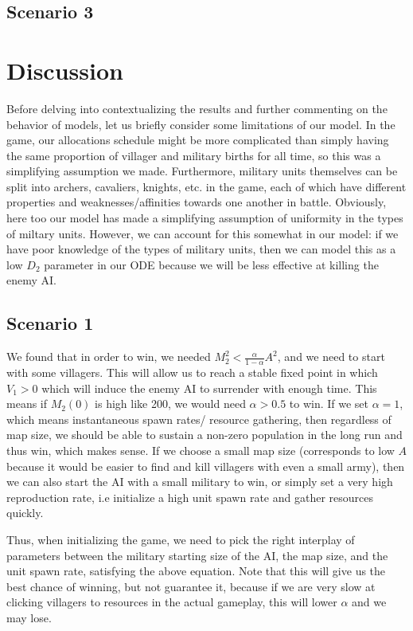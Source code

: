 \documentclass[12pt]{article}
\begin{document}
\subsection{Scenario 3}


\section{Discussion}
Before delving into contextualizing the results and further commenting on the behavior of models, let us briefly consider some limitations of our model. In the game, our allocations schedule might be more complicated than simply having the same proportion of villager and military births for all time, so this was a simplifying assumption we made. Furthermore, military units themselves can be split into archers, cavaliers, knights, etc. in the game, each of which have different properties and weaknesses/affinities towards one another in battle. Obviously, here too our model has made a simplifying assumption of uniformity in the types of miltary units. However, we can account for this somewhat in our model: if we have poor knowledge of the types of military units, then we can model this as a low $D_2$ parameter in our ODE because we will be less effective at killing the enemy AI.

\subsection{Scenario 1}
We found that in order to win, we needed $M_2^2 < \frac{\alpha}{1 - \alpha} A^2$, and we need to start with some villagers. This will allow us to reach a stable fixed point in which $V_1 > 0$ which will induce the enemy AI to surrender with enough time. This means if $M_2(0)$ is high like 200, we would need $\alpha > 0.5$ to win. If we set $\alpha = 1$, which means instantaneous spawn rates/ resource gathering, then regardless of map size, we should be able to sustain a non-zero population in the long run and thus win, which makes sense. If we choose a small map size (corresponds to low $A$ because it would be easier to find and kill villagers with even a small army), then we can also start the AI with a small military to win, or simply set a very high reproduction rate, i.e initialize a high unit spawn rate and gather resources quickly. \par

Thus, when initializing the game, we need to pick the right interplay of parameters between the military starting size of the AI, the map size, and the unit spawn rate, satisfying the above equation. Note that this will give us the best chance of winning, but not guarantee it, because if we are very slow at clicking villagers to resources in the actual gameplay, this will lower $\alpha$ and we may lose.
\end{document}
